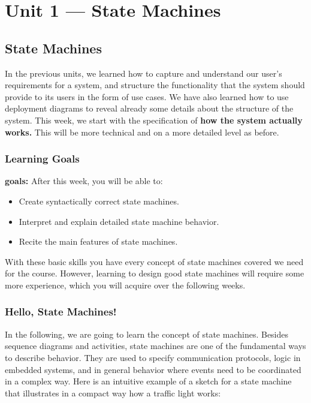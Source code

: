 \documentclass[10pt, twoside, twocolumn]{book}
\providecommand{\tightlist}{%
  \setlength{\itemsep}{0pt}\setlength{\parskip}{0pt}}
\begin{document}
\chapter{Unit 1 — State Machines}
\hypertarget{state-machines}{%
\section{State Machines}\label{state-machines}}

In the previous units, we learned how to capture and understand our
user's requirements for a system, and structure the functionality that
the system should provide to its users in the form of use cases. We have
also learned how to use deployment diagrams to reveal already some
details about the structure of the system. This week, we start with the
specification of \textbf{how the system actually works.} This will be
more technical and on a more detailed level as before.

\hypertarget{learning-goals}{%
\subsection{Learning Goals}\label{learning-goals}}

\textbf{goals:} After this week, you will be able to:

\begin{itemize}
\tightlist
\item
  Create syntactically correct state machines.
\item
  Interpret and explain detailed state machine behavior.
\item
  Recite the main features of state machines.
\end{itemize}

With these basic skills you have every concept of state machines covered
we need for the course. However, learning to design good state machines
will require some more experience, which you will acquire over the
following weeks.

\hypertarget{hello-state-machines}{%
\subsection{Hello, State Machines!}\label{hello-state-machines}}

In the following, we are going to learn the concept of state machines.
Besides sequence diagrams and activities, state machines are one of the
fundamental ways to describe behavior. They are used to specify
communication protocols, logic in embedded systems, and in general
behavior where events need to be coordinated in a complex way. Here is
an intuitive example of a sketch for a state machine that illustrates in
a compact way how a traffic light works:
\end{document}
